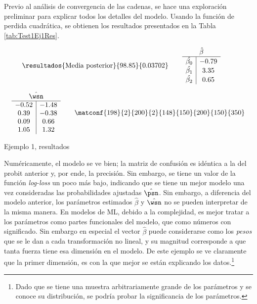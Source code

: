 Previo al análisis de convergencia de las cadenas, se hace una exploración preliminar para explicar todos los detalles del modelo. Usando la función de perdida cuadrática, se obtienen los resultados presentados en la Tabla \ref{tab:Test1Ej1Res}.

\begin{table}[h]
\begin{align*}
\resultados{\text{Media posterior}}{98.85}{0.03702}
\quad\quad
\begin{array}{c|c}
\multicolumn{2}{c}{\hat{\beta}} \\
\hline
\hat{\beta_0} & -0.79 \\
\hat{\beta_1} & 3.35 \\
\hat{\beta_2} & 0.65 \\
\end{array}
\quad\quad
\end{align*} 

\begin{align*}
\begin{array}{c|c}
\multicolumn{2}{c}{\hat{\wsn}} \\
\hline
-0.52 	& -1.48 \\
0.39	& -0.38 \\
0.09	& 0.66 \\
1.05	& 1.32
\end{array}
\quad\quad
\matconf{198}{2}{200}{2}{148}{150}{200}{150}{350}
\end{align*}
\caption{Ejemplo 1, resultados}
\label{tab:Test1Ej1Res}
\end{table}

Numéricamente, el modelo se ve bien; la matriz de confusión es idéntica a la del probit anterior y, por ende, la precisión. Sin embargo, se tiene un valor de la función \textit{log-loss} un poco más bajo, indicando que se tiene un mejor modelo una vez consideradas las probabilidades ajustadas $\hat{\psn}$. Sin embargo, a diferencia del modelo anterior, los parámetros estimados $\hat{\beta}$ y $\hat{\wsn}$ no se pueden interpretar de la misma manera. En modelos de ML, debido a la complejidad, es mejor tratar a los parámetros como partes funcionales del modelo, que como números con significado. Sin embargo en especial el vector $\hat{\beta}$ puede considerarse como los \textit{pesos} que se le dan a cada transformación no lineal, y su magnitud corresponde a que tanta fuerza tiene esa dimensión en el modelo. De este ejemplo se ve claramente que la primer dimensión, es con la que mejor se están explicando los datos.\footnote{Dado que se tiene una muestra arbitrariamente grande de los parámetros y se conoce su distribución, se podría probar la significancia de los parámetros.}

